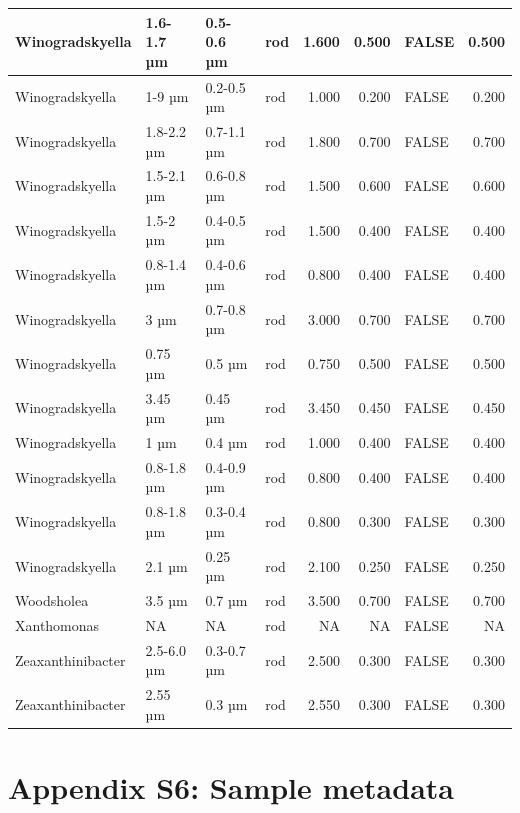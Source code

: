 \documentclass[
]{article}
\begin{document}
\begin{table}
\begin{tabular}{l|l|l|l|r|r|l|r}
\hline
Winogradskyella & 1.6-1.7 µm & 0.5-0.6 µm & rod & 1.600 & 0.500 & FALSE & 0.500\\
\hline
Winogradskyella & 1-9 µm & 0.2-0.5 µm & rod & 1.000 & 0.200 & FALSE & 0.200\\
\hline
Winogradskyella & 1.8-2.2 µm & 0.7-1.1 µm & rod & 1.800 & 0.700 & FALSE & 0.700\\
\hline
Winogradskyella & 1.5-2.1 µm & 0.6-0.8 µm & rod & 1.500 & 0.600 & FALSE & 0.600\\
\hline
Winogradskyella & 1.5-2 µm & 0.4-0.5 µm & rod & 1.500 & 0.400 & FALSE & 0.400\\
\hline
Winogradskyella & 0.8-1.4 µm & 0.4-0.6 µm & rod & 0.800 & 0.400 & FALSE & 0.400\\
\hline
Winogradskyella & 3 µm & 0.7-0.8 µm & rod & 3.000 & 0.700 & FALSE & 0.700\\
\hline
Winogradskyella & 0.75 µm & 0.5 µm & rod & 0.750 & 0.500 & FALSE & 0.500\\
\hline
Winogradskyella & 3.45 µm & 0.45 µm & rod & 3.450 & 0.450 & FALSE & 0.450\\
\hline
Winogradskyella & 1 µm & 0.4 µm & rod & 1.000 & 0.400 & FALSE & 0.400\\
\hline
Winogradskyella & 0.8-1.8 µm & 0.4-0.9 µm & rod & 0.800 & 0.400 & FALSE & 0.400\\
\hline
Winogradskyella & 0.8-1.8 µm & 0.3-0.4 µm & rod & 0.800 & 0.300 & FALSE & 0.300\\
\hline
Winogradskyella & 2.1 µm & 0.25 µm & rod & 2.100 & 0.250 & FALSE & 0.250\\
\hline
Woodsholea & 3.5 µm & 0.7 µm & rod & 3.500 & 0.700 & FALSE & 0.700\\
\hline
Xanthomonas & NA & NA & rod & NA & NA & FALSE & NA\\
\hline
Zeaxanthinibacter & 2.5-6.0 µm & 0.3-0.7 µm & rod & 2.500 & 0.300 & FALSE & 0.300\\
\hline
Zeaxanthinibacter & 2.55 µm & 0.3 µm & rod & 2.550 & 0.300 & FALSE & 0.300\\
\hline
\end{tabular}
\end{table}

\hypertarget{appendix-s6-sample-metadata}{%
\section{Appendix S6: Sample
metadata}\label{appendix-s6-sample-metadata}}
\end{document}
